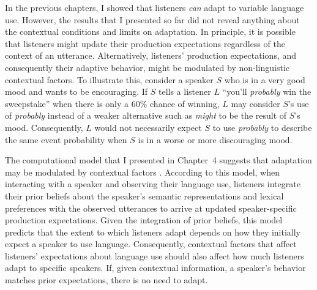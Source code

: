 
In the previous chapters, I showed that listeners \emph{can} adapt to variable language use. However, the results that I presented so far did not reveal anything about the contextual conditions and limits on adaptation. In principle, it is possible that listeners might update their production expectations regardless of the context of an utterance.  Alternatively, listeners' production expectations, and consequently their adaptive behavior, might be modulated by non-linguistic contextual factors. To illustrate this, consider a speaker $S$ who is in a very good mood and wants to be encouraging. If $S$ tells a listener $L$ ``you'll \textit{probably} win the sweepstake'' when there is only a 60\% chance of winning, $L$ may consider $S$'s use of \textit{probably} instead of a weaker alternative such as \textit{might} to be the result of $S$'s mood. Consequently, $L$ would not necessarily expect $S$ to use \textit{probably} to describe the same event probability when $S$ is in a worse or more discouraging mood.


The computational model that I presented in Chapter~4 suggests that adaptation may be modulated by contextual factors . According to this model, when interacting with a speaker and observing their language use, listeners integrate their prior beliefs about the speaker's semantic representations and lexical preferences with the observed utterances to arrive at updated speaker-specific production expectations. Given the integration of prior beliefs, this model predicts that the extent to which listeners adapt depends on how they initially expect a speaker to use language. Consequently, contextual factors that affect listeners' expectations about language use should also affect how much listeners adapt to specific speakers. If, given contextual information, a speaker's behavior matches prior expectations, there is no need to adapt.

